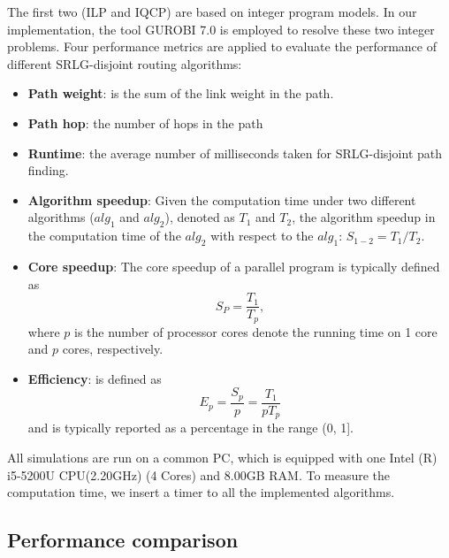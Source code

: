 The first two (ILP and IQCP) are based on integer program models. In our implementation, the tool GUROBI 7.0\cite{optimization2012gurobi} is employed to resolve these two integer problems. Four performance metrics are applied to evaluate the performance of different SRLG-disjoint routing algorithms:
\begin{itemize}
  \item \textbf{Path weight}: is the sum of the link weight in the path. 
  \item \textbf{Path hop}: the number of hops in the path
  \item \textbf{Runtime}: the average number of milliseconds taken for SRLG-disjoint path finding.
  \item \textbf{Algorithm speedup}: Given the computation time under two different  algorithms ($alg_1$ and $alg_2$), denoted as $T_1$ and $T_2$, the algorithm speedup in the computation time of the $alg_2$ with respect to the $alg_1$: ${S_{1 - 2}} = T_1/T_2$.
  \item \textbf{Core speedup}: The core speedup \cite{bryant2003computer} of a parallel program is typically defined as
\begin{equation}
\label{equ:speed}
S_P=\frac{T_1}{T_p},
\end{equation}
where $p$ is the number of processor cores  denote the running time on 1 core and $p$ cores, respectively.

  \item \textbf{Efficiency}: is defined \cite{bryant2003computer} as
\begin{equation}\label{equ:efficient}
E_p=\frac{S_p}{p}=\frac{T_1}{pT_p}
\end{equation}
and is typically reported as a percentage in the range (0, 1].

\end{itemize}

All simulations are run on a common PC, which is equipped with one Intel (R)  i5-5200U CPU(2.20GHz) (4 Cores) and 8.00GB RAM. To measure the computation time, we insert a timer to all the implemented algorithms.

\subsection{Performance comparison}

